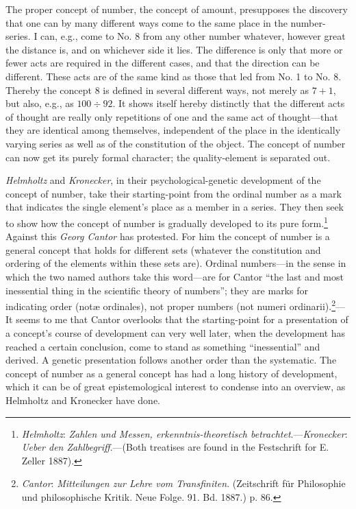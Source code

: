 \documentclass[12pt,a4paper]{book}
\newcommand{\opage}[1]{\marginnote{\footnotesize\textit{[#1]}}}
\begin{document}
The proper concept of number, the concept of amount, presupposes the
discovery that one can by many different ways come to the same place in the
number-series. I can, e.g., come to No. 8 from any other number whatever,
however great the distance is, and on whichever side it lies. The difference
is only that more or fewer acts are required in the different cases, and that
the direction can be different. These acts are of the same kind as those that
led from No. 1 to No. 8. Thereby the concept 8 is defined in several different
ways, not \opage{191}merely as $7+1$, but also, e.g., as $100 \div 92$. It shows itself
hereby distinctly that the different acts of thought are really only
repetitions of one and the same act of thought---that they are identical
among themselves, independent of the place in the identically varying series
as well as of the constitution of the object. The concept of number can now
get its purely formal character; the quality-element is separated out.

\emph{Helmholtz} and \emph{Kronecker}, in their psychological-genetic
development of the concept of number, take their starting-point from the
ordinal number as a mark that indicates the single element's place as a
member in a series. They then seek to show how the concept of number is
gradually developed to its pure form.\footnote{\emph{Helmholtz}: \emph{Zahlen
und Messen, erkenntnis-theoretisch betrachtet}.---\emph{Kronecker}:
\emph{Ueber den Zahlbegriff}.---(Both treatises are found in the Festschrift
for E. Zeller 1887).} Against this \emph{Georg Cantor} has protested. For him
the concept of number is a general concept that holds for different sets
(whatever the constitution and ordering of the elements within these sets
are). Ordinal numbers---in the sense in which the two named authors take this
word---are for Cantor ``the last and most inessential thing in the scientific
theory of numbers''; they are marks for indicating order (notæ ordinales),
not proper numbers (not numeri ordinarii).\footnote{\emph{Cantor}:
\emph{Mitteilungen zur Lehre vom Transfiniten}. (Zeitschrift für Philosophie
und philosophische Kritik. Neue Folge. 91. Bd. 1887.) p. 86.}---It seems to
me that Cantor overlooks that the starting-point for a presentation of a
concept's course of development can very well later, when the development has
reached a certain conclusion, come to stand as something ``inessential'' and
derived. A genetic presentation follows another order than the systematic.
The concept of number as a general concept has had a long history of
development, which it can be of great epistemological interest to condense
into an overview, as Helmholtz and Kronecker have done.
\end{document}
